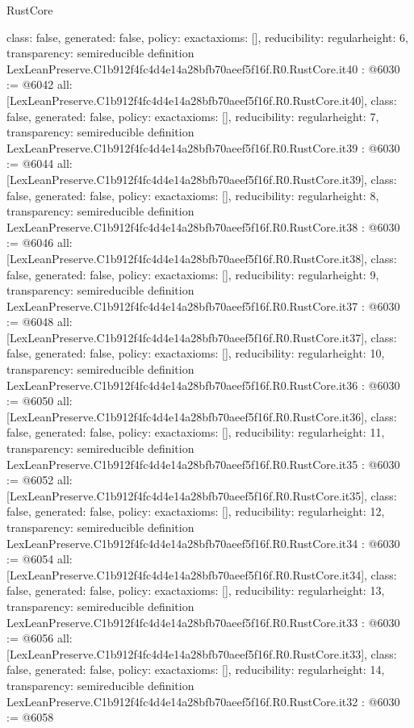 \begin{lexlean}{RustCore}
\begin{coremodule}
{  class: false,
  generated: false,
  policy: exact{axioms: []},
  reducibility: regular{height: 6},
  transparency: semireducible
}
definition LexLeanPreserve.C1b912f4fc4d4e14a28bfb70aeef5f16f.R0.RustCore.it40 : @6030 := @6042 {
  all: [LexLeanPreserve.C1b912f4fc4d4e14a28bfb70aeef5f16f.R0.RustCore.it40],
  class: false,
  generated: false,
  policy: exact{axioms: []},
  reducibility: regular{height: 7},
  transparency: semireducible
}
definition LexLeanPreserve.C1b912f4fc4d4e14a28bfb70aeef5f16f.R0.RustCore.it39 : @6030 := @6044 {
  all: [LexLeanPreserve.C1b912f4fc4d4e14a28bfb70aeef5f16f.R0.RustCore.it39],
  class: false,
  generated: false,
  policy: exact{axioms: []},
  reducibility: regular{height: 8},
  transparency: semireducible
}
definition LexLeanPreserve.C1b912f4fc4d4e14a28bfb70aeef5f16f.R0.RustCore.it38 : @6030 := @6046 {
  all: [LexLeanPreserve.C1b912f4fc4d4e14a28bfb70aeef5f16f.R0.RustCore.it38],
  class: false,
  generated: false,
  policy: exact{axioms: []},
  reducibility: regular{height: 9},
  transparency: semireducible
}
definition LexLeanPreserve.C1b912f4fc4d4e14a28bfb70aeef5f16f.R0.RustCore.it37 : @6030 := @6048 {
  all: [LexLeanPreserve.C1b912f4fc4d4e14a28bfb70aeef5f16f.R0.RustCore.it37],
  class: false,
  generated: false,
  policy: exact{axioms: []},
  reducibility: regular{height: 10},
  transparency: semireducible
}
definition LexLeanPreserve.C1b912f4fc4d4e14a28bfb70aeef5f16f.R0.RustCore.it36 : @6030 := @6050 {
  all: [LexLeanPreserve.C1b912f4fc4d4e14a28bfb70aeef5f16f.R0.RustCore.it36],
  class: false,
  generated: false,
  policy: exact{axioms: []},
  reducibility: regular{height: 11},
  transparency: semireducible
}
definition LexLeanPreserve.C1b912f4fc4d4e14a28bfb70aeef5f16f.R0.RustCore.it35 : @6030 := @6052 {
  all: [LexLeanPreserve.C1b912f4fc4d4e14a28bfb70aeef5f16f.R0.RustCore.it35],
  class: false,
  generated: false,
  policy: exact{axioms: []},
  reducibility: regular{height: 12},
  transparency: semireducible
}
definition LexLeanPreserve.C1b912f4fc4d4e14a28bfb70aeef5f16f.R0.RustCore.it34 : @6030 := @6054 {
  all: [LexLeanPreserve.C1b912f4fc4d4e14a28bfb70aeef5f16f.R0.RustCore.it34],
  class: false,
  generated: false,
  policy: exact{axioms: []},
  reducibility: regular{height: 13},
  transparency: semireducible
}
definition LexLeanPreserve.C1b912f4fc4d4e14a28bfb70aeef5f16f.R0.RustCore.it33 : @6030 := @6056 {
  all: [LexLeanPreserve.C1b912f4fc4d4e14a28bfb70aeef5f16f.R0.RustCore.it33],
  class: false,
  generated: false,
  policy: exact{axioms: []},
  reducibility: regular{height: 14},
  transparency: semireducible
}
definition LexLeanPreserve.C1b912f4fc4d4e14a28bfb70aeef5f16f.R0.RustCore.it32 : @6030 := @6058 {
}
\end{coremodule}
\end{lexlean}
